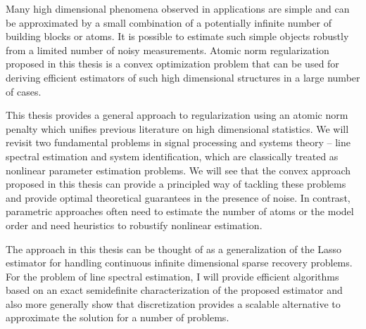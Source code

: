 { 
Many high dimensional phenomena observed in applications are simple and can be
approximated by a small combination of a potentially infinite number of building
blocks or atoms. It is possible to estimate such simple objects robustly from a
limited number of noisy measurements. Atomic norm regularization proposed in
this thesis is a convex optimization problem that can be used for deriving
efficient estimators of such high dimensional structures in a large number of
cases.

This thesis provides a general approach to regularization using an atomic norm
penalty which unifies previous literature on high dimensional statistics. We
will revisit two fundamental problems in signal processing and systems theory --
line spectral estimation and system identification, which are classically
treated as nonlinear parameter estimation problems. We will see that the convex
approach proposed in this thesis can provide a principled way of tackling these
problems and provide optimal theoretical guarantees in the presence of noise. In
contrast, parametric approaches often need to estimate the number of atoms or
the model order and need heuristics to robustify nonlinear estimation.

The approach in this thesis can be thought of as a generalization of the Lasso
estimator for handling continuous infinite dimensional sparse recovery problems.
For the problem of line spectral estimation, I will provide efficient algorithms
based on an exact semidefinite characterization of the proposed estimator and
also more generally show that discretization provides a scalable alternative to
approximate the solution for a number of problems.
}
